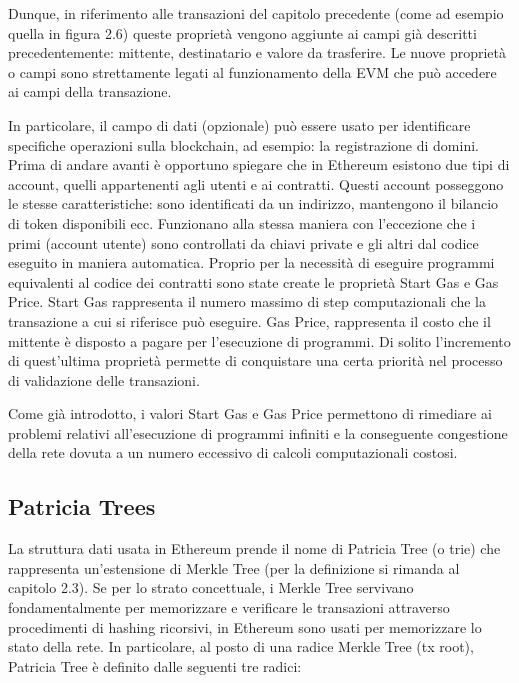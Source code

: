 Dunque, in riferimento alle transazioni del capitolo precedente (come ad esempio quella in figura 2.6) queste proprietà vengono aggiunte ai campi già descritti precedentemente: mittente, destinatario e valore da trasferire. Le nuove proprietà o campi sono strettamente legati al funzionamento della EVM che può accedere ai campi della transazione.

In particolare, il campo di dati (opzionale) può essere usato per identificare specifiche operazioni sulla blockchain, ad esempio: la registrazione di domini. Prima di andare avanti è opportuno spiegare che in Ethereum esistono due tipi di account, quelli appartenenti agli utenti e ai contratti. Questi account posseggono le stesse caratteristiche: sono identificati da un indirizzo, mantengono il bilancio di token disponibili ecc. Funzionano alla stessa maniera con l’eccezione che i primi (account utente) sono controllati da chiavi private e gli altri dal codice eseguito in maniera automatica. Proprio per la necessità di eseguire programmi equivalenti al codice dei contratti sono state create le proprietà Start Gas e Gas Price. Start Gas rappresenta il numero massimo di step computazionali che la transazione a cui si riferisce può eseguire. Gas Price, rappresenta il costo che il mittente è disposto a pagare per l’esecuzione di programmi. Di solito l’incremento di quest’ultima proprietà permette di conquistare una certa priorità nel processo di validazione delle transazioni.

Come già introdotto, i valori Start Gas e Gas Price permettono di rimediare ai problemi relativi all'esecuzione di programmi infiniti e la conseguente congestione della rete dovuta a un numero eccessivo di calcoli computazionali costosi.

\subsection{Patricia Trees}

La struttura dati usata in Ethereum prende il nome di Patricia Tree (o trie) che rappresenta un’estensione di Merkle Tree (per la definizione si rimanda al capitolo 2.3). Se per lo strato concettuale, i Merkle Tree servivano fondamentalmente per memorizzare e verificare le transazioni attraverso procedimenti di hashing ricorsivi, in Ethereum sono usati per memorizzare lo stato della rete. In particolare, al posto di una radice Merkle Tree (tx root), Patricia Tree è definito dalle seguenti tre radici:

